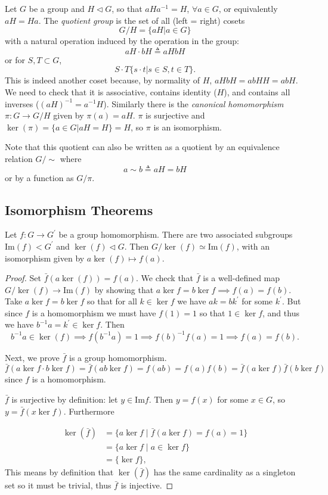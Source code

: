 \begin{defn}
Let $G$ be a group and $H \triangleleft G$, so that $aHa^{-1} = H$,
$\forall a \in G$, or equivalently $aH = Ha$.
The \emph{quotient group} is the set of all (left = right) cosets
$$
G / H = \{ aH | a \in G \}
$$
with a natural operation induced by the operation in the group:
$$
aH \cdot bH \triangleq aHbH
$$
or for $S, T \subset G$,
$$
S \cdot T \{ s \cdot t | s \in S, t \in T \}.
$$
This is indeed another coset because, by normality of $H$,
$aHbH = abHH = abH$. We need to check that it is associative, contains
identity ($H$), and contains all inverses ($(aH)^{-1} = a^{-1}H$).
Similarly there is the
\emph{canonical homomorphism} $\pi : G \to G/H$ given by
$\pi(a) = aH$. $\pi$ is surjective and
$\ker(\pi) = \{ a \in G | aH = H \} = H$, so $\pi$ is an isomorphism.
\end{defn}

Note that this quotient can also be written as a quotient by an
equivalence relation $G/\sim$ where
$$
a \sim b \triangleq aH = bH
$$
or by a function as $G/\pi$.

\subsection{Isomorphism Theorems}

\begin{theorem}
Let $f : G \to G^\prime$ be a group homomorphism. There are two
associated subgroups $\mathrm{Im}(f) < G^\prime$ and
$\ker(f) \triangleleft G$. Then
$G / \ker(f) \simeq \mathrm{Im}(f)$, with an isomorphism given by
$a \ker(f) \mapsto f(a)$.
\end{theorem}
\begin{proof}
Set $\bar{f}(a \ker (f)) = f(a)$. We check that $\bar{f}$ is a
well-defined map $G / \ker(f) \to \mathrm{Im}(f)$ by showing that
$a \ker f = b \ker f \implies f(a) = f(b)$. Take
$a \ker f = b \ker f$ so that for all $k \in \ker f$ we have
$a k = b k^\prime$ for some $k^\prime$. But since $f$ is a homomorphism
we must have $f(1) = 1$ so that $1 \in \ker f$, and thus we have
$b^{-1} a = k^\prime \in \ker f$. Then
$$
b^{-1} a \in \ker(f)
  \implies f(b^{-1} a) = 1
  \implies f(b)^{-1} f(a) = 1
  \implies f(a) = f(b).
$$

Next, we prove $\bar{f}$ is a group homomorphism.
$$
\bar{f}(a \ker f \cdot b \ker f)
  = \bar{f} (a b \ker f)
  = f(ab)
  = f(a)f(b)
  = \bar{f}(a \ker f) \bar{f}(b \ker f)
$$
since $f$ is a homomorphism.

$\bar{f}$ is surjective by definition: let $y \in \mathrm{Im} f$. Then $y = f(x)$
for some $x \in G$, so $y = \bar{f}(x \ker f)$. Furthermore

\begin{align*}
\ker(\bar{f}) & = \{ a \ker f \mid \bar{f}(a \ker f) = f(a) = 1 \} \\
              & = \{ a \ker f \mid a \in \ker f \} \\
              & = \{ \ker f \},
\end{align*}
This means by definition that $\ker(\bar{f})$ has the same cardinality
as a singleton set so it must be trivial, thus $\bar{f}$ is injective.
\end{proof}

